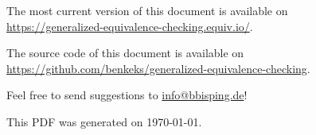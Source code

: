 \noindent
The most current version of this document is available on\\
\url{https://generalized-equivalence-checking.equiv.io/}.

\vspace{0.5cm}

\noindent
The source code of this document is available on\\
\url{https://github.com/benkeks/generalized-equivalence-checking}.

\vspace{0.5cm}

\noindent
Feel free to send suggestions to \href{mailto:info@bbisping.de}{info@bbisping.de}!

\vspace{0.5cm}

\noindent
This PDF was generated on \today.
\clearpage

%

\let\mainmatterforreal=\mainmatter
\renewcommand{\mainmatter}{}
